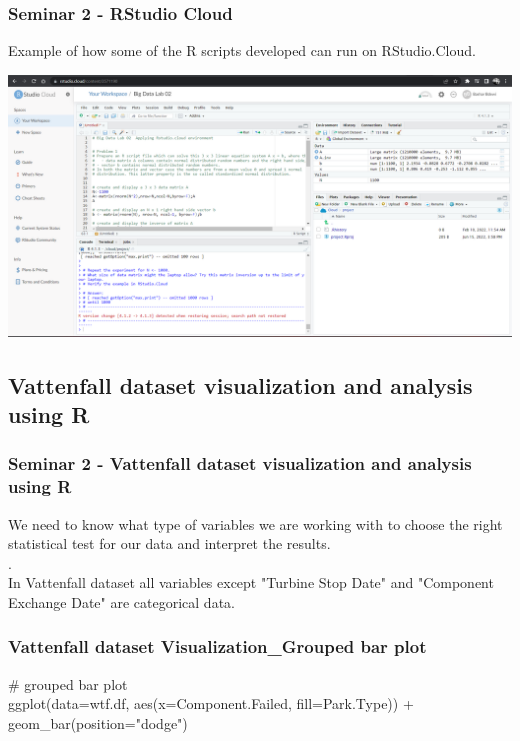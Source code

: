 \documentclass{beamer}
\begin{document}
\begin{frame}
\frametitle{Seminar 2 - RStudio Cloud}
Example of how some of the R scripts developed can run on RStudio.Cloud.\newline

\includegraphics[width=1\linewidth]{Seminar_2_images/R/b Rcloud.png}


\end{frame}

\subsection{Vattenfall dataset visualization and analysis using R} 
\begin{frame}
\frametitle{Seminar 2 - Vattenfall dataset visualization and analysis using R}


We need to know what type of variables we are working with to choose the right statistical test for our data and interpret the results.\\\newline
.\\
In Vattenfall dataset all variables except "Turbine Stop Date" and "Component Exchange Date" are categorical data.
\end{frame}
\begin{frame}[fragile] %
\frametitle{Vattenfall dataset Visualization\_Grouped bar plot}

\begin{example} 
\# grouped bar plot\\

ggplot(data=wtf.df, aes(x=Component.Failed, fill=Park.Type)) + 
  geom\_bar(position="dodge")
\end{example}
\end{frame}
\end{document}
